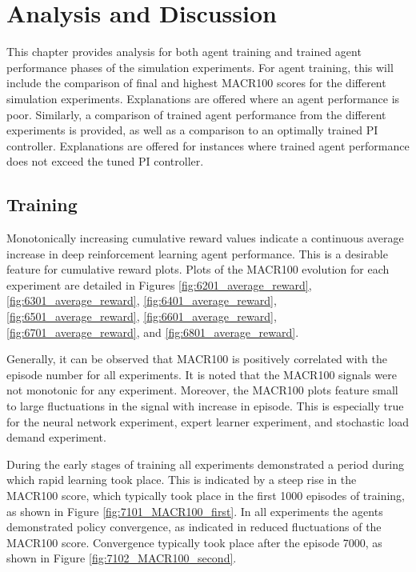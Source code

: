 \chapter{Analysis and Discussion}

This chapter provides analysis for both agent training and trained agent performance phases of the simulation experiments. For agent training, this will include the comparison of final and highest MACR100 scores for the different simulation experiments. Explanations are offered where an agent performance is poor. Similarly, a comparison of trained agent performance from the different experiments is provided, as well as a comparison to an optimally trained PI controller. Explanations are offered for instances where trained agent performance does not exceed the tuned PI controller.

\section{Training}
Monotonically increasing cumulative reward values indicate a continuous average increase in deep reinforcement learning agent performance. This is a desirable feature for cumulative reward plots. Plots of the MACR100 evolution for each experiment are detailed in Figures \ref{fig:6201_average_reward}, \ref{fig:6301_average_reward}, \ref{fig:6401_average_reward}, \ref{fig:6501_average_reward}, \ref{fig:6601_average_reward}, \ref{fig:6701_average_reward}, and \ref{fig:6801_average_reward}.

Generally, it can be observed that MACR100 is positively correlated with the episode number for all experiments. It is noted that the MACR100 signals were not monotonic for any experiment. Moreover, the MACR100 plots feature small to large fluctuations in the signal with increase in episode. This is especially true for the neural network experiment, expert learner experiment, and stochastic load demand experiment.

During the early stages of training all experiments demonstrated a period during which rapid learning took place. This is indicated by a steep rise in the MACR100 score, which typically took place in the first 1000 episodes of training, as shown in Figure \ref{fig:7101_MACR100_first}. In all experiments the agents demonstrated policy convergence, as indicated in reduced fluctuations of the MACR100 score. Convergence typically took place after the episode 7000, as shown in Figure \ref{fig:7102_MACR100_second}.

\clearpage


